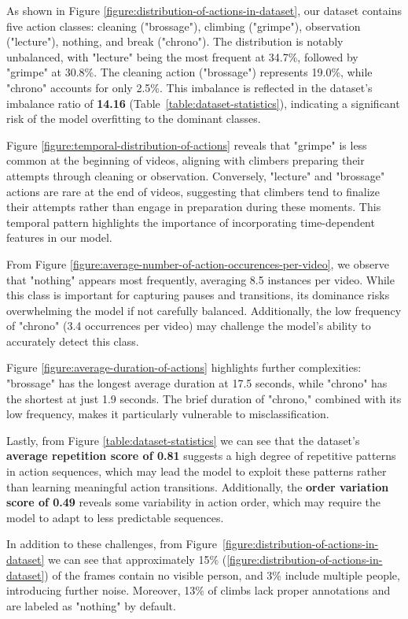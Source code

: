As shown in Figure \ref{figure:distribution-of-actions-in-dataset}, our dataset contains five action classes: cleaning ("brossage"), climbing ("grimpe"), observation ("lecture"), nothing, and break ("chrono"). The distribution is notably unbalanced, with "lecture" being the most frequent at 34.7\%, followed by "grimpe" at 30.8\%. The cleaning action ("brossage") represents 19.0\%, while "chrono" accounts for only 2.5\%. This imbalance is reflected in the dataset's imbalance ratio of \textbf{14.16} (Table~\ref{table:dataset-statistics}), indicating a significant risk of the model overfitting to the dominant classes.

Figure \ref{figure:temporal-distribution-of-actions} reveals that "grimpe" is less common at the beginning of videos, aligning with climbers preparing their attempts through cleaning or observation. Conversely, "lecture" and "brossage" actions are rare at the end of videos, suggesting that climbers tend to finalize their attempts rather than engage in preparation during these moments. This temporal pattern highlights the importance of incorporating time-dependent features in our model.

From Figure \ref{figure:average-number-of-action-occurences-per-video}, we observe that "nothing" appears most frequently, averaging 8.5 instances per video. While this class is important for capturing pauses and transitions, its dominance risks overwhelming the model if not carefully balanced. Additionally, the low frequency of "chrono" (3.4 occurrences per video) may challenge the model's ability to accurately detect this class.

Figure \ref{figure:average-duration-of-actions} highlights further complexities: "brossage" has the longest average duration at 17.5 seconds, while "chrono" has the shortest at just 1.9 seconds. The brief duration of "chrono," combined with its low frequency, makes it particularly vulnerable to misclassification.

Lastly, from Figure \ref{table:dataset-statistics} we can see that the dataset's \textbf{average repetition score of 0.81} suggests a high degree of repetitive patterns in action sequences, which may lead the model to exploit these patterns rather than learning meaningful action transitions. Additionally, the \textbf{order variation score of 0.49} reveals some variability in action order, which may require the model to adapt to less predictable sequences.

In addition to these challenges, from Figure~\ref{figure:distribution-of-actions-in-dataset} we can see that approximately 15\% (\ref{figure:distribution-of-actions-in-dataset}) of the frames contain no visible person, and 3\% include multiple people, introducing further noise. Moreover, 13\% of climbs lack proper annotations and are labeled as "nothing" by default.

